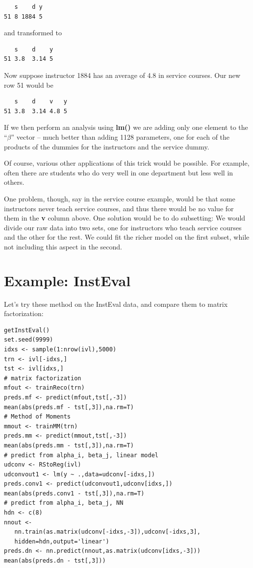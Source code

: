 \begin{lstlisting}
   s    d y 
51 8 1884 5       
\end{lstlisting}

and transformed to

\begin{lstlisting}
   s    d    y 
51 3.8  3.14 5       
\end{lstlisting}

Now suppose instructor 1884 has an average of 4.8 in service courses.
Our new row 51 would be

\begin{lstlisting}
   s    d    v   y 
51 3.8  3.14 4.8 5       
\end{lstlisting}

If we then perform an analysis using \textbf{lm()} we are adding only
one element to the ``$\beta$'' vector -- much better than adding 1128
parameters, one for each of the products of the dummies for the
instructors and the service dummy.

Of course, various other applications of this trick would be possible.
For example, often there are students who do very well in one department
but less well in others.

One problem, though, say in the service course example, would be that
some instructors never teach service courses, and thus there would be no
value for them in the \textbf{v} column above.  One solution would be to
do subsetting:  We would divide our raw data into two sets, one for
instructors who teach service courses and the other for the rest.  We
could fit the richer model on the first subset, while not including this
aspect in the second.

\section{Example: InstEval}

Let's try these method on the InstEval data, and compare them to matrix
factorization:

\begin{lstlisting}
getInstEval()
set.seed(9999)
idxs <- sample(1:nrow(ivl),5000)
trn <- ivl[-idxs,]
tst <- ivl[idxs,]
# matrix factorization
mfout <- trainReco(trn)
preds.mf <- predict(mfout,tst[,-3])
mean(abs(preds.mf - tst[,3]),na.rm=T)  
# Method of Moments
mmout <- trainMM(trn)
preds.mm <- predict(mmout,tst[,-3])  
mean(abs(preds.mm - tst[,3]),na.rm=T)
# predict from alpha_i, beta_j, linear model
udconv <- RStoReg(ivl)
udconvout1 <- lm(y ~ .,data=udconv[-idxs,])
preds.conv1 <- predict(udconvout1,udconv[idxs,])
mean(abs(preds.conv1 - tst[,3]),na.rm=T)  
# predict from alpha_i, beta_j, NN
hdn <- c(8)
nnout <-
   nn.train(as.matrix(udconv[-idxs,-3]),udconv[-idxs,3],
   hidden=hdn,output='linear')
preds.dn <- nn.predict(nnout,as.matrix(udconv[idxs,-3]))
mean(abs(preds.dn - tst[,3]))  
\end{lstlisting}

